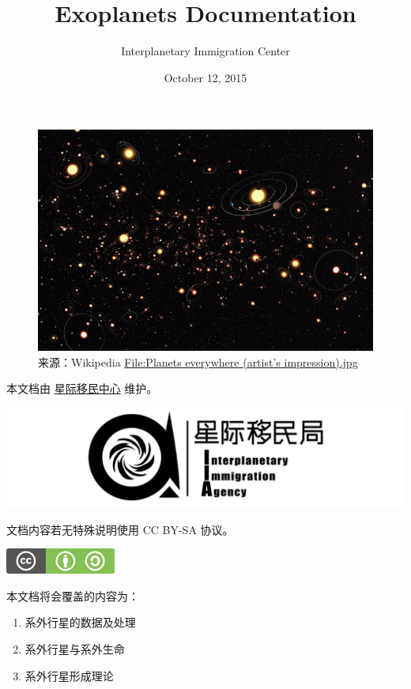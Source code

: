 \documentclass[letterpaper,10pt,english]{sphinxmanual}
\title{Exoplanets Documentation}
\date{October 12, 2015}
\author{Interplanetary Immigration Center}
\begin{document}
\maketitle
\tableofcontents
{}\label{index::doc}

\begin{figure}[htbp]
\centering
\capstart

\includegraphics{Planets_everywhere_artist_impression.jpg}
\caption{来源：Wikipedia \href{https://en.wikipedia.org/wiki/File:Planets\_everywhere\_(artist\%E2\%80\%99s\_impression).jpg}{File:Planets everywhere (artist’s impression).jpg}}\end{figure}

本文档由 \href{http://interimm.github.io/}{星际移民中心} 维护。

{\hfill\includegraphics{banner.png}\hfill}

文档内容若无特殊说明使用 CC BY-SA 协议。

{\hfill\includegraphics{cc_bysa.flat.guokr.32.png}\hfill}

本文档将会覆盖的内容为：
\begin{enumerate}
\item {} 
系外行星的数据及处理

\item {} 
系外行星与系外生命

\item {} 
系外行星形成理论

\end{enumerate}
\end{document}
